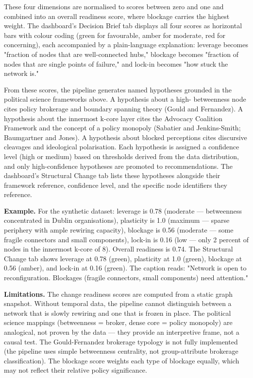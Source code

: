 \documentclass[11pt,a4paper]{article}
\begin{document}
These four dimensions are normalised to scores between zero and one and
combined into an overall readiness score, where blockage carries the
highest weight. The dashboard's Decision Brief tab displays all four
scores as horizontal bars with colour coding (green for favourable, amber
for moderate, red for concerning), each accompanied by a plain-language
explanation: leverage becomes "fraction of nodes that are well-connected
hubs," blockage becomes "fraction of nodes that are single points of
failure," and lock-in becomes "how stuck the network is."

From these scores, the pipeline generates named hypotheses grounded in
the political science frameworks above. A hypothesis about a high-
betweenness node cites policy brokerage and boundary spanning theory
(Gould and Fernandez). A hypothesis about the innermost k-core layer
cites the Advocacy Coalition Framework and the concept of a policy
monopoly (Sabatier and Jenkins-Smith; Baumgartner and Jones). A
hypothesis about blocked perceptions cites discursive cleavages and
ideological polarisation. Each hypothesis is assigned a confidence level
(high or medium) based on thresholds derived from the data distribution,
and only high-confidence hypotheses are promoted to recommendations. The
dashboard's Structural Change tab lists these hypotheses alongside their
framework reference, confidence level, and the specific node identifiers
they reference.

\textbf{Example.} For the synthetic dataset: leverage is 0.78 (moderate —
betweenness concentrated in Dublin organisations), plasticity is 1.0
(maximum — sparse periphery with ample rewiring capacity), blockage is
0.56 (moderate — some fragile connectors and small components), lock-in
is 0.16 (low — only 2 percent of nodes in the innermost k-core of 8).
Overall readiness is 0.74. The Structural Change tab shows leverage at
0.78 (green), plasticity at 1.0 (green), blockage at 0.56 (amber), and
lock-in at 0.16 (green). The caption reads: "Network is open to
reconfiguration. Blockages (fragile connectors, small components) need
attention."

\textbf{Limitations.} The change readiness scores are computed from a static
graph snapshot. Without temporal data, the pipeline cannot distinguish
between a network that is slowly rewiring and one that is frozen in
place. The political science mappings (betweenness = broker, dense core
= policy monopoly) are analogical, not proven by the data — they provide
an interpretive frame, not a causal test. The Gould-Fernandez brokerage
typology is not fully implemented (the pipeline uses simple betweenness
centrality, not group-attribute brokerage classification). The blockage
score weights each type of blockage equally, which may not reflect their
relative policy significance.
\end{document}
